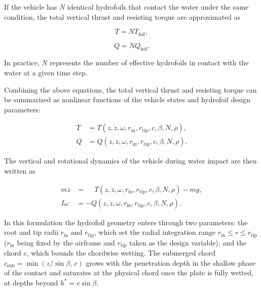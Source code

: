 If the vehicle has $N$ identical hydrofoils that contact the water under the same condition, the total vertical thrust and resisting torque are approximated as

\begin{equation}
    T = N T_{\mathrm{foil}},
    \label{eq:total_vehicle_thrust}
\end{equation}

\begin{equation}
    Q = N Q_{\mathrm{foil}}.
    \label{eq:total_vehicle_torque}
\end{equation}

In practice, $N$ represents the number of effective hydrofoils in contact with the water at a given time step.

Combining the above equations, the total vertical thrust and resisting torque can be summarized as nonlinear functions of the vehicle states and hydrofoil design parameters:

\begin{align}
    T &= T\left(
        z,\dot{z},\omega,r_{\mathrm{in}},r_{\mathrm{tip}},c,\beta,N,\rho
    \right),
    \label{eq:T_function} \\[2pt]
    Q &= Q\left(
        z,\dot{z},\omega,r_{\mathrm{in}},r_{\mathrm{tip}},c,\beta,N,\rho
    \right).
    \label{eq:Q_function}
\end{align}

The vertical and rotational dynamics of the vehicle during water impact are then written as

\begin{align}
    m\ddot{z} &= \phantom{-}T\left(
        z,\dot{z},\omega,r_{\mathrm{in}},r_{\mathrm{tip}},c,\beta,N,\rho
    \right) - mg,
    \label{eq:vertical_dynamics_function} \\[2pt]
    I\dot{\omega} &= -Q\left(
        z,\dot{z},\omega,r_{\mathrm{in}},r_{\mathrm{tip}},c,\beta,N,\rho
    \right).
    \label{eq:rotational_dynamics_function}
\end{align}

In this formulation the hydrofoil geometry enters through two parameters: the root and tip radii $r_{\mathrm{in}}$ and $r_{\mathrm{tip}}$, which set the radial integration range $r_{\mathrm{in}} \le r \le r_{\mathrm{tip}}$ ($r_{\mathrm{in}}$ being fixed by the airframe and $r_{\mathrm{tip}}$ taken as the design variable), and the chord $c$, which bounds the chordwise wetting. The submerged chord $c_{\mathrm{sub}} = \min(z/\sin{\beta},\,c)$ grows with the penetration depth in the shallow phase of the contact and saturates at the physical chord once the plate is fully wetted, at depths beyond $h^{*} = c\sin{\beta}$.

